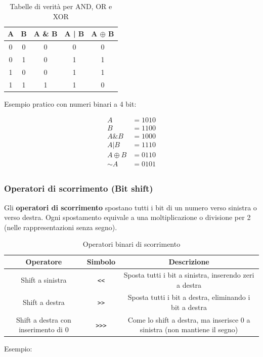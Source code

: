 \documentclass[12pt]{article}
\begin{document}
\begin{table}[h]
\centering
\begin{tabular}{|c|c|c|c|c|}
\hline
\textbf{A} & \textbf{B} & \textbf{A \& B} & \textbf{A | B} & \textbf{A $\oplus$ B} \\
\hline
0 & 0 & 0 & 0 & 0 \\
0 & 1 & 0 & 1 & 1 \\
1 & 0 & 0 & 1 & 1 \\
1 & 1 & 1 & 1 & 0 \\
\hline
\end{tabular}
\caption{Tabelle di verità per AND, OR e XOR}
\end{table}
Esempio pratico con numeri binari a 4 bit:

\[
\begin{array}{rl}
A &= 1010 \\
B &= 1100 \\
\hline
A \& B &= 1000 \\
A | B &= 1110 \\
A \oplus B &= 0110 \\
\sim A &= 0101 \\
\end{array}
\]

\subsubsection{Operatori di scorrimento (Bit shift)}

Gli \textbf{operatori di scorrimento} spostano tutti i bit di un numero verso sinistra o verso destra.  
Ogni spostamento equivale a una moltiplicazione o divisione per 2 (nelle rappresentazioni senza segno).

\begin{table}[h]
\centering
\resizebox{\textwidth}{!} {
  \begin{tabular}{|c|c|c|}
\hline
\textbf{Operatore} & \textbf{Simbolo} & \textbf{Descrizione} \\
\hline
Shift a sinistra & \texttt{<<} & Sposta tutti i bit a sinistra, inserendo zeri a destra \\
Shift a destra & \texttt{>>} & Sposta tutti i bit a destra, eliminando i bit a destra \\
Shift a destra con inserimento di 0 & \texttt{>>>} & Come lo shift a destra, ma inserisce 0 a sinistra (non mantiene il segno) \\
\hline
\end{tabular}
}
\caption{Operatori binari di scorrimento}
\end{table}
Esempio:
\end{document}
